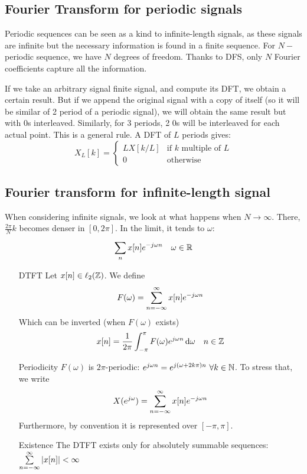 \documentclass[11pt,a4paper]{article}
\begin{document}
\subsection{Fourier Transform for periodic signals}
Periodic sequences can be seen as a kind to infinite-length signals, as these signals are infinite but the necessary information is found in a finite sequence. For $N-$periodic sequence, we have $N$ degrees of freedom. Thanks to DFS, only $N$ Fourier coefficients capture all the information.

If we take an arbitrary signal finite signal, and compute its DFT, we obtain a certain result. But if we append the original signal with a copy of itself (so it will be similar of 2 period of a periodic signal), we will obtain the same result but with 0s interleaved. Similarly, for 3 periods, 2 0s will be interleaved for each actual point. This is a general rule. A DFT of $L$ periods gives:
\begin{equation}
	X_L[k] = %
	\left\{\begin{array}{ll}
		LX[k/L] & \text{if } k \text{ multiple of }L \\
		0       & \text{otherwise}
	\end{array}\right.
\end{equation}%

\subsection{Fourier transform for infinite-length signal}
When considering infinite signals, we look at what happens when $N\to\infty$. There, $\frac{2\pi}{N}k$ becomes denser in $[0,2\pi]$. In the limit, it tends to $\omega$:
\[\sum\limits_{n}^{}x[n]e^{-j\omega n}\quad \omega \in \mathbb{R}\]


\begin{itemize}
	\item[DTFT]Let $x[n] \in \ell_2(\mathbb{Z})$. We define
	      \begin{equation}
		      F(\omega) = \sum\limits_{n = -\infty}^{\infty} x[n]e^{-j\omega n}
	      \end{equation}
	      Which can be inverted (when $F(\omega)$ exists)
	      \begin{equation}
		      x[n] = \frac{1}{2\pi}\int_{-\pi}^\pi F(\omega)e^{j\omega n}\, \mathrm d \omega\quad n\in \mathbb{Z}
	      \end{equation}
	\item[Periodicity]$F(\omega)$ is $2\pi$-periodic: $e^{j\omega n} = e^{j(\omega + 2k\pi)n}\ \forall k \in \N$. To stress that, we write
	      \begin{equation}
		      X(e^{j\omega}) = \sum\limits_{n=-\infty}^{\infty}x[n]e^{-j\omega n}
	      \end{equation}
	      Furthermore, by convention it is represented over $[-\pi,\pi]$.
	\item[Existence]The DTFT exists only for absolutely summable sequences: $\sum\limits_{n=-\infty}^{\infty}|x[n]| < \infty$
\end{itemize}
\end{document}
